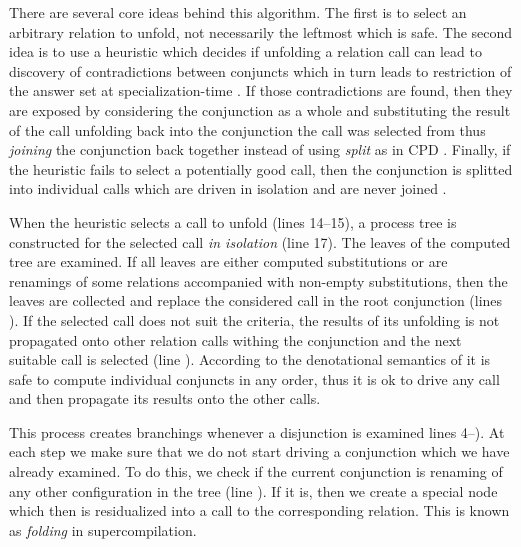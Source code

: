 There are several core ideas behind this algorithm.
The first is to select an arbitrary relation to unfold, not necessarily the leftmost which is safe.
The second idea is to use a heuristic which decides if unfolding a relation call can lead to discovery of contradictions between conjuncts which in turn leads to restriction of the answer set at specialization-time .
If those contradictions are found, then they are exposed by considering the conjunction as a whole and substituting the result of the call unfolding back into the conjunction the call was selected from thus \emph{joining} the conjunction back together instead of using \emph{split} as in CPD .
Finally, if the heuristic fails to select a potentially good call, then the conjunction is splitted into individual calls which are driven in isolation and are never joined .

When the heuristic selects a call to unfold (lines 14--15), a process tree is constructed for the selected call \emph{in isolation} (line 17).
The leaves of the computed tree are examined.
If all leaves are either computed substitutions or are renamings of some relations accompanied with non-empty substitutions, then the leaves are collected and replace the considered call in the root conjunction (lines ).
If the selected call does not suit the criteria, the results of its unfolding is not propagated onto other relation calls withing the conjunction and the next suitable call is selected (line ).
According to the denotational semantics of \mk{} it is safe to compute individual conjuncts in any order, thus it is ok to drive any call and then propagate its results onto the other calls.


This process creates branchings whenever a disjunction is examined lines 4--).
At each step we make sure that we do not start driving a conjunction which we have already examined.
To do this, we check if the current conjunction is renaming of any other configuration in the tree (line ).
If it is, then we create a special node which then is residualized into a call to the corresponding relation.
This is known as \emph{folding} in supercompilation.

